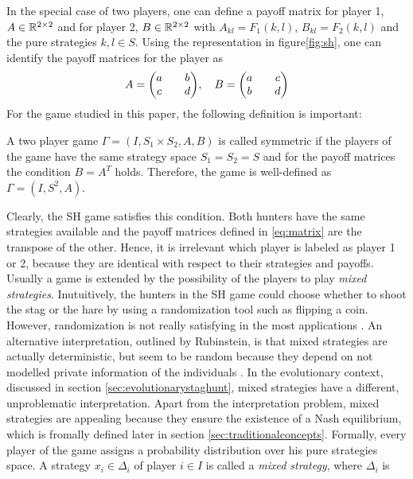 In the special case of two players, one 
can define a payoff matrix for player 1, $A \in \mathbb{R}^{2 \times2}$ and for 
player 2,  $B \in \mathbb{R}^{2 \times2}$ with $A_{kl} = F_1(k,l)$, 
$B_{kl} = F_2(k,l)$ and the pure strategies $k,l \in S$. Using the 
representation in figure\ref{fig:sh}, one can identify the 
payoff matrices for the player as
\begin{align}
     A = \mqty(a && b \\ c && d), \quad B = \mqty(a && c \\ b && d)
        \label{eq:matrix}
\end{align}
For the game studied in this paper, the following definition is important: 
\begin{mydef}
        A two player game $\Gamma=(I,S_1 \times S_2, A,B)$ is called symmetric
        if the players of the game have the same strategy space $S_1=S_2=S$ and
        for the payoff matrices the condition $B=A^T$ holds. Therefore, the
        game is well-defined as $\Gamma=(I,S^2,A)$.
        \label{symmetry}
\end{mydef}
Clearly, the SH game satisfies this condition. Both hunters have the same 
strategies available and the payoff matrices defined in 
\eqref{eq:matrix}  are the transpose of the other.
Hence, it is irrelevant which player is labeled as player 1 or 2, because 
they are identical with respect to their strategies and payoffs.
Usually a game is extended by the possibility of the players to play
\textit{mixed strategies}. 
Inutuitively, the hunters in the SH game could  
choose whether to shoot the stag or the hare by using a randomization
tool such as flipping a coin. However, randomization is not really
satisfying in the most applications \parencite{radner_private_1982}. An
alternative interpretation, outlined by Rubinstein, is that mixed 
strategies are actually deterministic, but seem to be random because they 
depend on not modelled private information of the individuals 
\parencite[914]{rubinstein_comments_1991}. In the evolutionary context,
discussed in section \ref{sec:evolutionarystaghunt}, mixed strategies have
a different, unproblematic interpretation. Apart from the interpretation 
problem, mixed strategies are appealing because they ensure the existence
of a Nash equilibrium, which is fromally defined later in section 
\ref{sec:traditionalconcepts}.
Formally, every player of the game assigns a probability distribution over
his pure strategies space. A strategy $x_i \in \Delta_i$ of 
player $i \in I$ is called a \textit{mixed strategy}, where $\Delta_i$ is 

